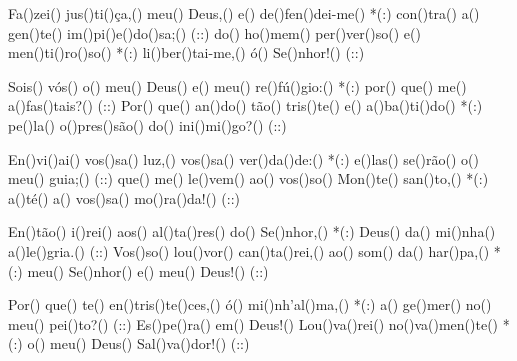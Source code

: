 Fa()zei() jus()ti()ça,() meu() Deus,() e() de()fen()dei-me() *(:)
con()tra() a() gen()te() im()pi()e()do()sa;() (::)
do() ho()mem() per()ver()so() e() men()ti()ro()so() *(:)
li()ber()tai-me,() ó() Se()nhor!() (::)

Sois() vós() o() meu() Deus() e() meu() re()fú()gio:() *(:)
por() que() me() a()fas()tais?() (::)
Por() que() an()do() tão() tris()te() e() a()ba()ti()do() *(:)
pe()la() o()pres()são() do() ini()mi()go?() (::)

En()vi()ai() vos()sa() luz,() vos()sa() ver()da()de:() *(:)
e()las() se()rão() o() meu() guia;() (::)
que() me() le()vem() ao() vos()so() Mon()te() san()to,() *(:)
a()té() a() vos()sa() mo()ra()da!() (::)

En()tão() i()rei() aos() al()ta()res() do() Se()nhor,() *(:)
Deus() da() mi()nha() a()le()gria.() (::)
Vos()so() lou()vor() can()ta()rei,() ao() som() da() har()pa,() *(:)
meu() Se()nhor() e() meu() Deus!() (::)

Por() que() te() en()tris()te()ces,() ó() mi()nh’al()ma,() *(:)
a() ge()mer() no() meu() pei()to?() (::)
Es()pe()ra() em() Deus!() Lou()va()rei() no()va()men()te() *(:)
o() meu() Deus() Sal()va()dor!() (::)